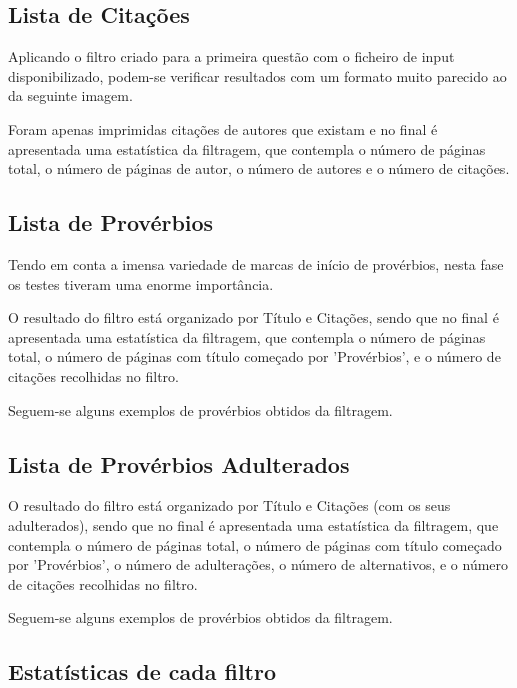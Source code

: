 \documentclass[11pt,a4paper]{report}
\begin{document}
\subsection{Lista de Citações}

Aplicando o filtro criado para a primeira questão com o ficheiro de input disponibilizado, podem-se verificar resultados com um formato muito parecido ao da seguinte imagem.

Foram apenas imprimidas citações de autores que existam e no final é apresentada uma estatística da filtragem, que contempla o número de páginas total, o número de páginas de autor, o número de autores e o número de citações.


\subsection{Lista de Provérbios}

Tendo em conta a imensa variedade de marcas de início de provérbios, nesta fase os testes tiveram uma enorme importância.

O resultado do filtro está organizado por Título e Citações, sendo que no final é apresentada uma estatística da filtragem, que contempla o número de páginas total, o número de páginas com título começado por 'Provérbios', e o número de citações recolhidas no filtro.

Seguem-se alguns exemplos de provérbios obtidos da filtragem.


\newpage

\subsection{Lista de Provérbios Adulterados}

O resultado do filtro está organizado por Título e Citações (com os seus adulterados), sendo que no final é apresentada uma estatística da filtragem, que contempla o número de páginas total, o número de páginas com título começado por 'Provérbios', o número de adulterações, o número de alternativos, e o número de citações recolhidas no filtro.

Seguem-se alguns exemplos de provérbios obtidos da filtragem.


\newpage

\subsection{Estatísticas de cada filtro}
\end{document}
